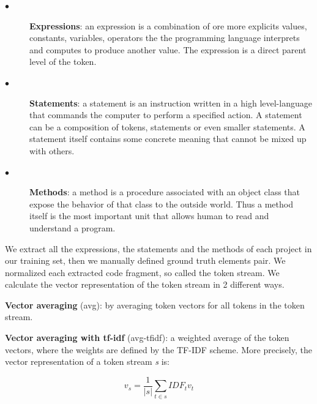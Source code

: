 \begin{description}
	\item [$\bullet$] \textbf{Expressions}: an expression is a combination of ore more explicits values, constants, variables, operators the the programming language interprets and computes to produce another value. The expression is a direct parent level of the token.
	
	\item [$\bullet$] \textbf{Statements}: a statement is an instruction written in a high level-language that commands the computer to perform a specified action. A statement can be a composition of tokens, statements or even smaller statements. A statement itself contains some concrete meaning that cannot be mixed up with others.
	
	\item [$\bullet$] \textbf{Methods}: a method is a procedure associated with an object class that expose the behavior of that class to the outside world. Thus a method itself is the most important unit that allows human to read and understand a program.
	
\end{description}


We extract all the expressions, the statements and the methods of each project in our training set, then we manually defined ground truth elements pair. We normalized each extracted code fragment, so called the token stream. We calculate the vector representation of the token stream in 2 different ways.

\textbf{Vector averaging} (avg): by averaging token vectors for all tokens in the token stream.

\textbf{Vector averaging with tf-idf} (avg-tfidf): a weighted average of the token vectors, where the weights are defined by the TF-IDF scheme. More precisely, the vector representation of a token stream \textit{s} is:

\begin{displaymath}
v_{s} = \frac{1}{|s|} \sum_{t \in s} IDF_{t}v_{t}
\end{displaymath}

